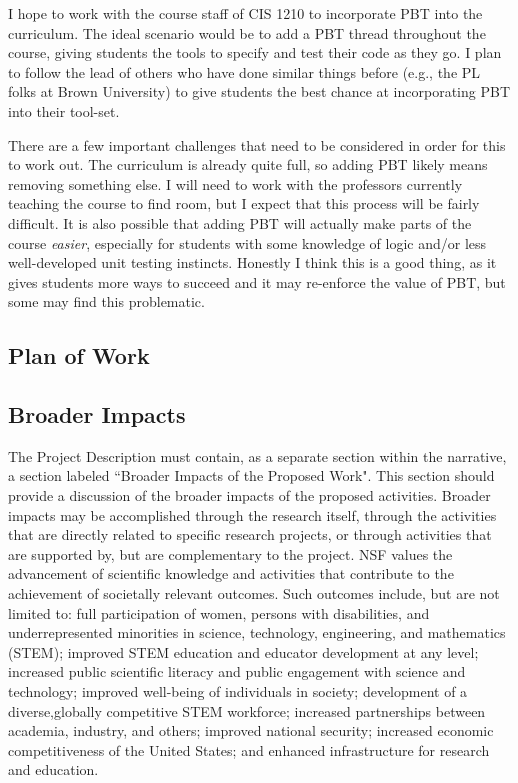 I hope to work with the course staff of CIS 1210 to incorporate PBT into the
curriculum. The ideal scenario would be to add a PBT thread throughout the
course, giving students the tools to specify and test their code as they go.  I
plan to follow the lead of others who have done similar things before (e.g., the
PL folks at Brown University) to give students the best chance at incorporating
PBT into their tool-set.

There are a few important challenges that need to be considered in order for
this to work out.  The curriculum is already quite full, so adding PBT likely
means removing something else. I will need to work with the professors currently
teaching the course to find room, but I expect that this process will be fairly
difficult. It is also possible that adding PBT will actually make parts of the
course {\em easier}, especially for students with some knowledge of logic and/or
less well-developed unit testing instincts. Honestly I think this is a good
thing, as it gives students more ways to succeed and it may re-enforce the value
of PBT, but some may find this problematic.

\subsection{Plan of Work }


\subsection{Broader Impacts }
The Project Description must contain, as a separate section within the narrative, a section labeled ``Broader
Impacts of the Proposed Work". This section should provide a discussion of the broader impacts of the proposed
activities. Broader impacts may be accomplished through the research itself, through the activities that are
directly related to specific research projects, or through activities that are supported by, but are complementary to
the project. NSF values the advancement of scientific knowledge and activities that contribute to the
achievement of societally relevant outcomes. Such outcomes include, but are not limited to: full
participation of women, persons with disabilities, and underrepresented minorities in science, technology, engineering, and
mathematics (STEM); improved STEM education and educator development at any level; increased public
scientific literacy and public engagement with science and technology; improved well-being of individuals in
society; development of a diverse,globally competitive STEM workforce; increased partnerships between
academia, industry, and others; improved national security; increased economic competitiveness of the United
States; and enhanced infrastructure for research and education.


